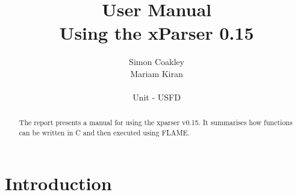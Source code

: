 \documentclass[12pt,a4paper]{report}
\begin{document}
\title{User Manual
\\Using the xParser 0.15}
\author{Simon Coakley\\Mariam Kiran
\\
\\ Unit - USFD}

\maketitle


\begin{abstract}
The report presents a manual for using the xparser v0.15. It
summarises how functions can be written in C and then executed using
FLAME.
\end{abstract}

\section{Introduction}






\end{document}
